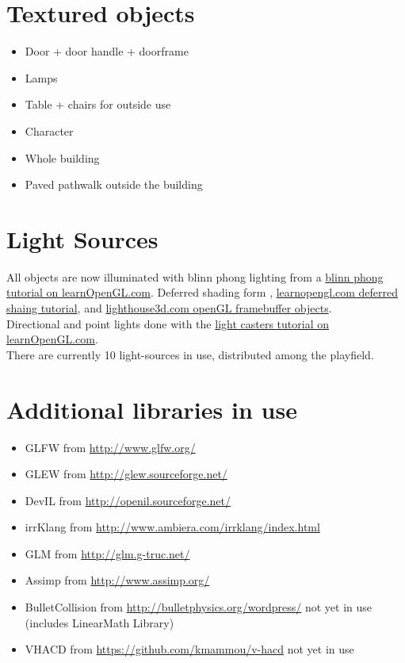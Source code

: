 \documentclass[12pt]{article}
\begin{document}

\section{Textured objects \label{Texture Mapping}}
\begin{itemize}
\item Door + door handle + doorframe
\item Lamps
\item Table + chairs for outside use
\item Character
\item Whole building
\item Paved pathwalk outside the building
\end{itemize}

\section{Light Sources \label{lightSources}}
All objects are now illuminated with blinn phong lighting from a \href{http://learnopengl.com/#!Advanced-Lighting/Advanced-Lighting}{blinn phong tutorial on learnOpenGL.com}. Deferred shading form \cite{openGLSuperBible}, \href{http://learnopengl.com/#!Advanced-Lighting/Deferred-Shading}{learnopengl.com deferred shaing tutorial}, and \href{http://www.lighthouse3d.com/tutorials/opengl_framebuffer_objects/}{lighthouse3d.com openGL framebuffer objects}.\\

Directional and point lights done with the \href{http://learnopengl.com/#!Lighting/Light-casters}{light casters tutorial on learnOpenGL.com}.\\


There are currently 10 light-sources in use, distributed among the playfield.

\section{Additional libraries in use}

\begin{itemize}
\item GLFW from \url{http://www.glfw.org/}
\item GLEW from \url{http://glew.sourceforge.net/}
\item DevIL from \url{http://openil.sourceforge.net/}
\item irrKlang from \url{http://www.ambiera.com/irrklang/index.html}
\item GLM from \url{http://glm.g-truc.net/}
\item Assimp from \url{http://www.assimp.org/}
\item BulletCollision from
\url{http://bulletphysics.org/wordpress/} not yet in use (includes LinearMath Library)
\item VHACD from 
\url{https://github.com/kmammou/v-hacd} not yet in use
\end{itemize}
\end{document}
